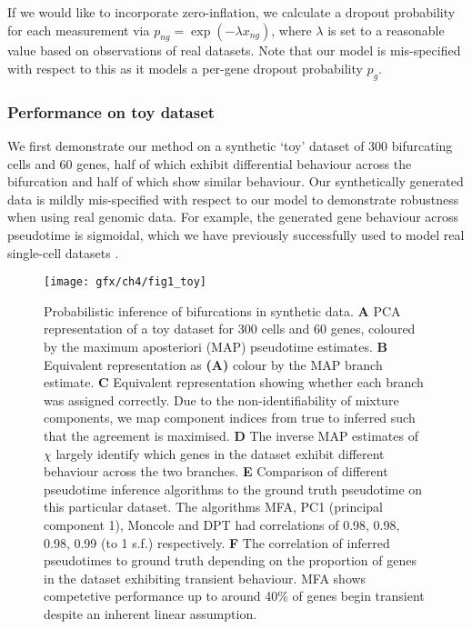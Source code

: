 If we would like to incorporate zero-inflation, we calculate a dropout probability for each measurement via $p_{ng} = \exp(-\lambda x_{ng})$, where $\lambda$ is set to a reasonable value based on observations of real datasets. Note that our model is mis-specified with respect to this as it models a per-gene dropout probability $p_g$.

\subsubsection{Performance on toy dataset}

We first demonstrate our method on a synthetic `toy' dataset of 300 bifurcating cells and 60 genes, half of which exhibit differential behaviour across the bifurcation and half of which show similar behaviour.
Our synthetically generated data is mildly mis-specified with respect to our model to demonstrate robustness when using real genomic data. For example, the generated gene behaviour across pseudotime is sigmoidal, which we have previously successfully used to model real single-cell datasets \cite{campbell2016order,campbell2016switchde}.

\begin{figure}
	\centering
	\texttt{[image: gfx/ch4/fig1\_toy]}
	\caption{Probabilistic inference of bifurcations in synthetic data. { \normalfont
\textbf{A} PCA representation of a toy dataset for 300 cells and 60 genes, coloured by the maximum aposteriori (MAP) pseudotime estimates.
\textbf{B} Equivalent representation as \textbf{(A)} colour by the MAP branch estimate.
\textbf{C} Equivalent representation showing whether each branch was assigned correctly. Due to the non-identifiability of mixture components, we map component indices from true to inferred such that the agreement is maximised.
\textbf{D} The inverse MAP estimates of $\chi$ largely identify which genes in the dataset exhibit different behaviour across the two branches.
\textbf{E} Comparison of different pseudotime inference algorithms to the ground truth pseudotime on this particular dataset. The algorithms MFA, PC1 (principal component 1), Moncole and DPT had correlations of 0.98, 0.98, 0.98, 0.99 (to 1 s.f.) respectively.
\textbf{F} The correlation of inferred pseudotimes to ground truth depending on the proportion of genes in the dataset exhibiting transient behaviour. MFA shows competetive performance up to around 40\% of genes begin transient despite an inherent linear assumption.
	}} \label{fig:toy}
\end{figure}

